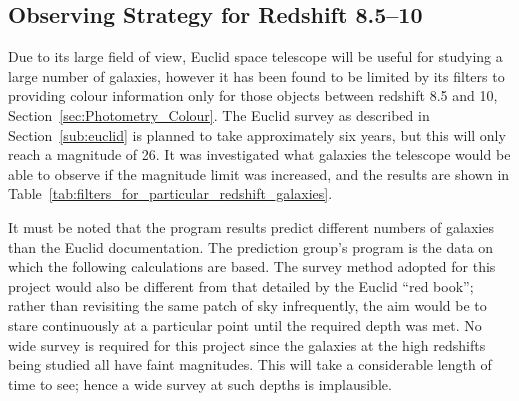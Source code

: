 
\subsection{Observing Strategy for Redshift 8.5--10} %
\label{sub:using_euclid_for_a_survey_of_edshift_8_54_to_10_1}
	Due to its large field of view, Euclid space telescope will be useful for studying a large number of galaxies, however it has been found to be limited by its filters to providing colour information only for those objects between redshift 8.5 and 10, Section~\ref{sec:Photometry_Colour}. The Euclid survey as described in Section~\ref{sub:euclid} is planned to take approximately six years, but this will only reach a magnitude of 26. It was investigated what galaxies the telescope would be able to observe if the magnitude limit was increased, and the results are shown in Table~\ref{tab:filters_for_particular_redshift_galaxies}.

	It must be noted that the program results predict different numbers of galaxies than the Euclid documentation. The prediction group’s program is the data on which the following calculations are based. The survey method adopted for this project would also be different from that detailed by the Euclid ``red book''; rather than revisiting the same patch of sky infrequently, the aim would be to stare continuously at a particular point until the required depth was met. No wide survey is required for this project since the galaxies at the high redshifts being studied all have faint magnitudes. This will take a considerable length of time to see; hence a wide survey at such depths is implausible.

